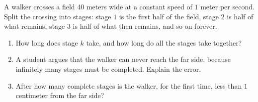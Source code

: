 A walker crosses a field $40$ meters wide at a constant speed of $1$ meter per second. Split the crossing into stages: stage $1$ is the first half of the field, stage $2$ is half of what remains, stage $3$ is half of what then remains, and so on forever.
\begin{enumerate}
\item[(a)] How long does stage $k$ take, and how long do all the stages take together?
\item[(b)] A student argues that the walker can never reach the far side, because infinitely many stages must be completed. Explain the error.
\item[(c)] After how many complete stages is the walker, for the first time, less than $1$ centimeter from the far side?
\end{enumerate}

